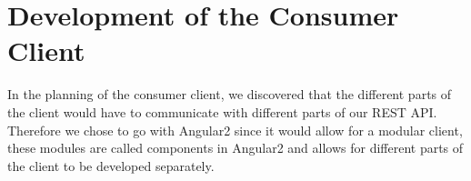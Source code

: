 \section{Development of the Consumer Client}\label{sec:DevelopmentConsumerClient}
In the planning of the consumer client, we discovered that the different parts of the client would have to communicate with different parts of our REST API.
Therefore we chose to go with Angular2 since it would allow for a modular client, these modules are called components in Angular2 and allows for different parts of the client to be developed separately.
